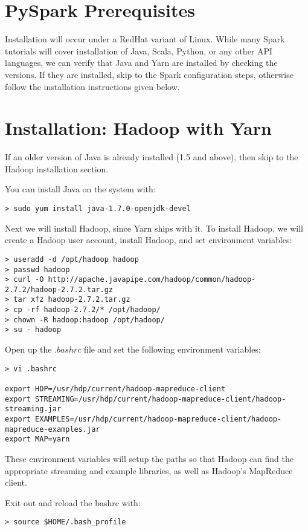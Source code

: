 \documentclass[9pt,twocolumn,twoside]{idsi}
\begin{document}
\section{PySpark Prerequisites}

Installation will occur under a RedHat variant of Linux. While many Spark tutorials will cover installation of Java, Scala, Python, or any other API languages, we can verify that Java and Yarn are installed by checking the versions. If they are installed, skip to the Spark configuration steps, otherwise follow the installation instructions given below.

\section{Installation: Hadoop with Yarn}
If an older version of Java is already installed (1.5 and above), then skip to the Hadoop installation section.

\noindent
You can install Java on the system with:
\begin{verbatim}
> sudo yum install java-1.7.0-openjdk-devel
\end{verbatim}

\noindent
Next we will install Hadoop, since Yarn ships with it. To install Hadoop, we will create a Hadoop user account, install Hadoop, and set environment variables:

\begin{lstlisting}[breaklines]
> useradd -d /opt/hadoop hadoop
> passwd hadoop
> curl -O http://apache.javapipe.com/hadoop/common/hadoop-2.7.2/hadoop-2.7.2.tar.gz 
> tar xfz hadoop-2.7.2.tar.gz
> cp -rf hadoop-2.7.2/* /opt/hadoop/
> chown -R hadoop:hadoop /opt/hadoop/
> su - hadoop
\end{lstlisting}

Open up the $.bashrc$ file and set the following environment variables:
\begin{lstlisting}[breaklines]
> vi .bashrc

export HDP=/usr/hdp/current/hadoop-mapreduce-client
export STREAMING=/usr/hdp/current/hadoop-mapreduce-client/hadoop-streaming.jar
export EXAMPLES=/usr/hdp/current/hadoop-mapreduce-client/hadoop-mapreduce-examples.jar
export MAP=yarn
\end{lstlisting}

These environment variables will setup the paths so that Hadoop can find the appropriate streaming and example libraries, as well as Hadoop's MapReduce client.

Exit out and reload the bashrc with:
\begin{verbatim}
> source $HOME/.bash_profile
\end{verbatim}
\end{document}
